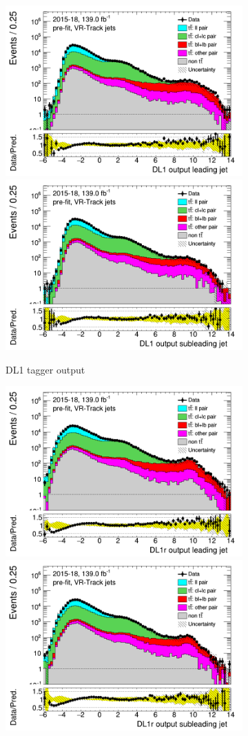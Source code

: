 \begin{figure}[H]
	\begin{subfigure}[t]{1\linewidth}
	\includegraphics[width=.45\textwidth]{FTAG_plots/pretagNoRwwithhighpTVRJetsall/DataMC_h_J0_DL1trackjet_log.png}
	\includegraphics[width=.45\textwidth]{FTAG_plots/pretagNoRwwithhighpTVRJetsall/DataMC_h_J1_DL1trackjet_log.png}\\
	\caption{DL1 tagger output}
	\end{subfigure}
	\begin{subfigure}[t]{1\linewidth}
	\includegraphics[width=.45\textwidth]{FTAG_plots/pretagNoRwwithhighpTVRJetsall/DataMC_h_J0_DL1rtrackjet_log.png}
	\includegraphics[width=.45\textwidth]{FTAG_plots/pretagNoRwwithhighpTVRJetsall/DataMC_h_J1_DL1rtrackjet_log.png}\\

\end{subfigure}
\end{figure}
